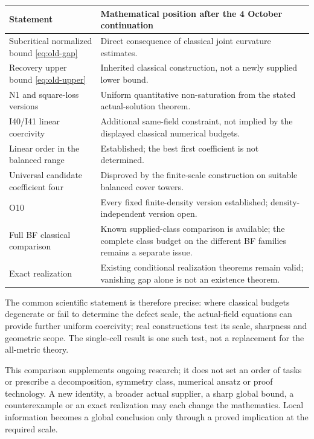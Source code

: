 \documentclass[11pt]{article}
\theoremstyle{remark}
\begin{document}
\begin{center}\small
\begin{tabularx}{\textwidth}{@{}p{}X@{}}\toprule
Statement & Mathematical position after the 4 October continuation\\\midrule
Subcritical normalized bound \eqref{eq:old-gap} &
Direct consequence of classical joint curvature estimates.\\
Recovery upper bound \eqref{eq:old-upper} &
Inherited classical construction, not a newly supplied lower bound.\\
N1 and square-loss versions &
Uniform quantitative non-saturation from the stated actual-solution theorem.\\
I40/I41 linear coercivity &
Additional same-field constraint, not implied by the displayed classical numerical budgets.\\
Linear order in the balanced range &
Established; the best first coefficient is not determined.\\
Universal candidate coefficient four &
Disproved by the finite-scale construction on suitable balanced cover towers.\\
O10 &
Every fixed finite-density version established; density-independent version open.\\
Full BF classical comparison &
Known supplied-class comparison is available; the complete class budget on the different BF families remains a separate issue.\\
Exact realization &
Existing conditional realization theorems remain valid; vanishing gap alone is not an existence theorem.\\\bottomrule
\end{tabularx}
\end{center}

The common scientific statement is therefore precise: where classical
budgets degenerate or fail to determine the defect scale, the actual-field
equations can provide further uniform coercivity; real constructions
test its scale, sharpness and geometric scope. The single-cell result
is one such test, not a replacement for the all-metric theory.

This comparison supplements ongoing research; it does not set an order
of tasks or prescribe a decomposition, symmetry class, numerical ansatz
or proof technology. A new identity, a broader actual supplier, a sharp
global bound, a counterexample or an exact realization may each change
the mathematics. Local information becomes a global conclusion only
through a proved implication at the required scale.
\end{document}
